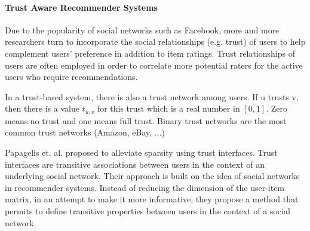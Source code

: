 

\paragraph{Trust Aware Recommender Systems}


Due to the popularity of social networks such as Facebook, more and more researchers turn to incorporate the social relationships (e.g. trust) of users to help complement users’ preference in addition to item ratings. Trust relationships of users are often employed in order to correlate more potential raters for the active users who require recommendations.

In a trust-based system, there is also a trust network among users. If u trusts v, then there is a value $t_{u,v}$ for this trust which is a real number in $[0,1]$. Zero means no trust and one means full trust. Binary trust networks are the most common trust networks (Amazon, eBay, ...)




Papagelis et. al. \cite{Papagelis2005} proposed to alleviate sparsity using trust interfaces. Trust interfaces are transitive associations between users in the context of an underlying social network. Their approach is built on the idea of social networks in recommender systems. Instead of reducing the dimension of the user-item matrix, in an attempt to make it more informative, they propose a method that permits to define transitive properties between users in the context of a social network.


